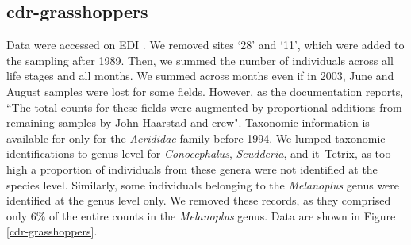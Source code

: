 \documentclass[11pt, oneside]{article}
\begin{document}
\subsection{cdr-grasshoppers}
Data were accessed on EDI \citep{cdr-grasshoppers}.
We removed sites `28' and `11', which were added to the sampling after 1989. 
Then, we summed the number of individuals across all life stages and all months. 
We summed across months even if in 2003, June and August samples were lost for some fields. 
However, as the documentation reports, ``The total counts for these fields were augmented by proportional additions from remaining samples by John Haarstad and crew".
Taxonomic information is available for only for the {\it Acrididae} family before 1994. 
We lumped taxonomic identifications to genus level for {\it Conocephalus}, {\it Scudderia}, and {it\ Tetrix}, as too high a proportion of individuals from these genera were not identified at the species level. 
Similarly, some individuals belonging to the {\it Melanoplus} genus were identified at the genus level only. 
We removed these records, as they comprised only 6$\%$ of the entire counts in the {\it Melanoplus} genus.
Data are shown in Figure \ref{cdr-grasshoppers}.
\end{document}
